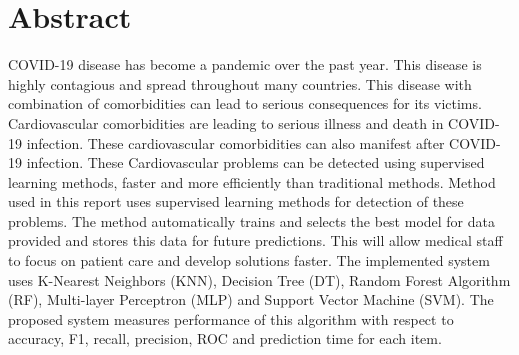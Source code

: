 \section*{\centering Abstract}

COVID-19 disease has become a pandemic over the past year. This disease is highly contagious and spread throughout many countries. This disease with combination of comorbidities can lead to serious consequences for its victims. Cardiovascular comorbidities are leading to serious illness and death in COVID-19 infection. These cardiovascular comorbidities can also manifest after COVID-19 infection. These Cardiovascular problems can be detected using supervised learning methods, faster and more efficiently than traditional methods. Method used in this report uses supervised learning methods for detection of these problems. The method automatically trains and selects the best model for data provided and stores this data for future predictions. This will allow medical staff to focus on patient care and develop solutions faster. The implemented system uses  K-Nearest Neighbors (KNN), Decision Tree (DT), Random Forest Algorithm (RF), Multi-layer Perceptron (MLP) and Support Vector Machine (SVM). The proposed system measures performance of this algorithm with respect to accuracy, F1, recall, precision, ROC and prediction time for each item.